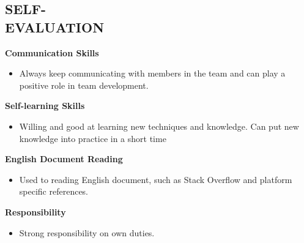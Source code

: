 \documentclass[margin]{res}
\begin{document}
\begin{resume}
\section{SELF- \\ EVALUATION}
{\bf Communication Skills}
\begin{itemize}
\item Always keep communicating with members in the team and can play a positive role in team development.
\end{itemize}
{\bf Self-learning Skills}
\begin{itemize}
\item Willing and good at learning new techniques and knowledge. Can put new knowledge into practice in a short time
\end{itemize}
{\bf English Document Reading}
\begin{itemize}
\item Used to reading English document, such as Stack Overflow and platform specific references.
\end{itemize}
{\bf Responsibility}
\begin{itemize}
\item Strong responsibility on own duties.
\end{itemize}
\end{resume}
\end{document}
